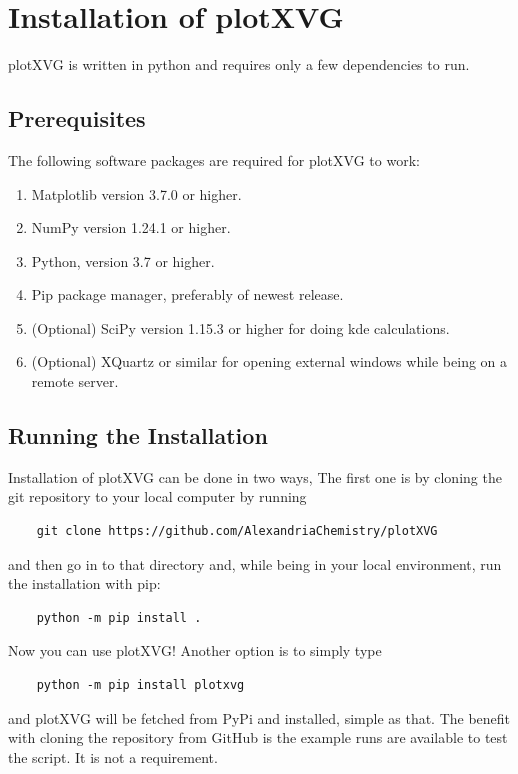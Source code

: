 \clearpage
\section{Installation of plotXVG}
plotXVG is written in python and requires only a few dependencies to run. 

\subsection{Prerequisites}
The following software packages are required for plotXVG to work:
\begin{enumerate}
    \item Matplotlib version 3.7.0 or higher.
    \item NumPy version 1.24.1 or higher.
    \item Python, version 3.7 or higher.
    \item Pip package manager, preferably of newest release.
    \item (Optional) SciPy version 1.15.3 or higher for doing kde calculations.
    \item (Optional) XQuartz or similar for opening external windows while being on a remote server.
\end{enumerate}

\subsection{Running the Installation}
Installation of plotXVG can be done in two ways, The first one is by cloning the git repository to your local computer by running
\begin{verbatim}
    git clone https://github.com/AlexandriaChemistry/plotXVG
\end{verbatim}
and then go in to that directory and, while being in your local environment, run the installation with pip:
\begin{verbatim}
    python -m pip install .
\end{verbatim}
Now you can use plotXVG! Another option is to simply type
\begin{verbatim}
    python -m pip install plotxvg
\end{verbatim}
and plotXVG will be fetched from PyPi and installed, simple as that. The benefit with cloning the repository from GitHub is the example runs are available to test the script. It is not a requirement.
